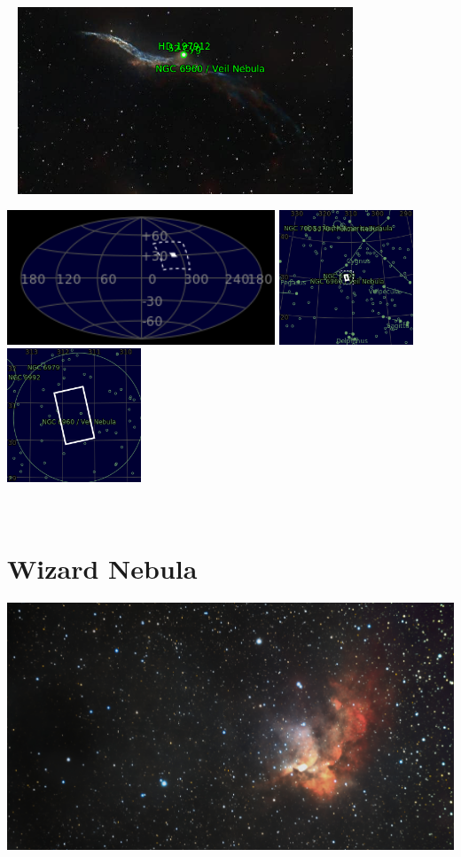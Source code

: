 \begin{center}
 \ \newpage
\includegraphics[width=0.75\textwidth]{../Imaging//Annotated/Western_Veil_Nebula_Annotated.jpg}

\includegraphics[height=4cm]{../Imaging//Annotated/Western_Veil_Nebula_Globe.jpg}
\includegraphics[height=4cm]{../Imaging//Annotated/Western_Veil_Nebula_Close.jpg}
\includegraphics[height=4cm]{../Imaging//Annotated/Western_Veil_Nebula_Closer.jpg}
\end{center}
\ \\\section{Wizard Nebula}
\includegraphics[width=\textwidth]{../Imaging//Original/Wizard_Nebula.jpg}

